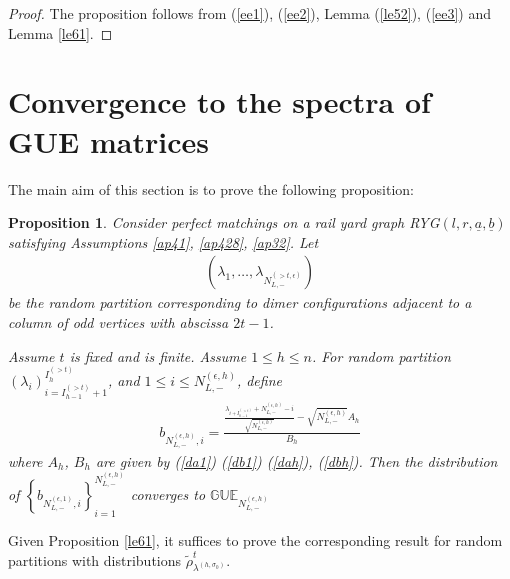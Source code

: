 \documentclass[11pt]{amsart}
\theoremstyle{plain}
\newtheorem{proposition}[theorem]{Proposition}
\theoremstyle{definition}
\theoremstyle{remark}
\newcommand\si{\sigma}
\numberwithin{equation}{section}
\numberwithin{theorem}{section}
\numberwithin{figure}{section}
\begin{document}
\begin{proof}The proposition follows from (\ref{ee1}), (\ref{ee2}), Lemma (\ref{le52}), (\ref{ee3}) and Lemma \ref{le61}. 
\end{proof}


\section{Convergence to the spectra of GUE matrices}\label{sect:sgue}


The main aim of this section is to prove the following proposition:
\begin{proposition}\label{p71}Consider perfect matchings on a rail yard graph RYG$(l,r,\underline{a},\underline{b})$ satisfying Assumptions \ref{ap41}, \ref{ap428}, \ref{ap32}. Let
\begin{align*}
\left(\lambda_1,\ldots,\lambda_{N_{L,-}^{(>t,\epsilon)}}\right)
\end{align*}
be the random partition corresponding to dimer configurations adjacent to a column of odd vertices with abscissa $2t-1$.

Assume $t$ is fixed and is finite. 
Assume $1\leq h\leq n$. For random partition $(\lambda_i)_{i=I_{h-1}^{(>t)}+1}^{I_h^{(>t)}}$,
and $1\leq i\leq N_{L,-}^{(\epsilon,h)}$, define
\begin{align*}
b_{N_{L,-}^{(\epsilon,h)},i}
=\frac{\frac{\lambda_{i+I_{h-1}^{(>t)}}+N_{L,-}^{(\epsilon,h)}-i}{\sqrt{N_{L,-}^{(\epsilon,h)}}}-\sqrt{N_{L,-}^{(\epsilon,h)}}A_h}{B_h}
\end{align*}
where $A_h$, $B_h$ are given by (\ref{da1}) (\ref{db1}) (\ref{dah}), (\ref{dbh}).
Then the distribution of $\left\{b_{N_{L,-}^{(\epsilon,1)},i}\right\}_{i=1}^{N_{L,-}^{(\epsilon,h)}}$ converges to $\mathbb{GUE}_{N_{L,-}^{(\epsilon,h)}}$
\end{proposition}

Given Proposition \ref{le61}, it suffices to prove the corresponding result for random partitions with distributions $\tilde{\rho}_{\lambda^{(h,\si_0)}}^t$.
\end{document}
